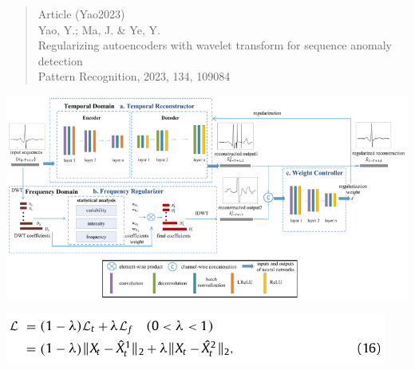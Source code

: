 \documentclass[
  letterpaper,
  DIV=11,
  numbers=noendperiod]{scrartcl}
\begin{document}
\begin{quote}
Article (Yao2023)\\
Yao, Y.; Ma, J. \& Ye, Y.\\
Regularizing autoencoders with wavelet transform for sequence anomaly
detection\\
Pattern Recognition, 2023, 134, 109084
\end{quote}

\includegraphics{img/2023-02-27-09-36-02.png}

\includegraphics{img/2023-02-27-09-36-27.png}
\end{document}
